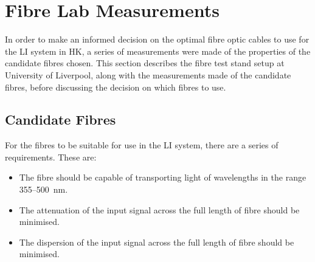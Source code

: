 \documentclass[a4paper,11pt]{article}
\begin{document}
\section{Fibre Lab Measurements}

In order to make an informed decision on the optimal fibre optic cables to use for the LI system in HK, a series of measurements were made of the properties of the candidate fibres chosen. This section describes the fibre test stand setup at University of Liverpool, along with the measurements made of the candidate fibres, before discussing the decision on which fibres to use.

\subsection{Candidate Fibres}

For the fibres to be suitable for use in the LI system, there are a series of requirements. These are:
\begin{itemize}
\item The fibre should be capable of transporting light of wavelengths in the range 355--500~nm.
\item The attenuation of the input signal across the full length of fibre should be minimised.
\item The dispersion of the input signal across the full length of fibre should be minimised.
\end{itemize}
\end{document}

